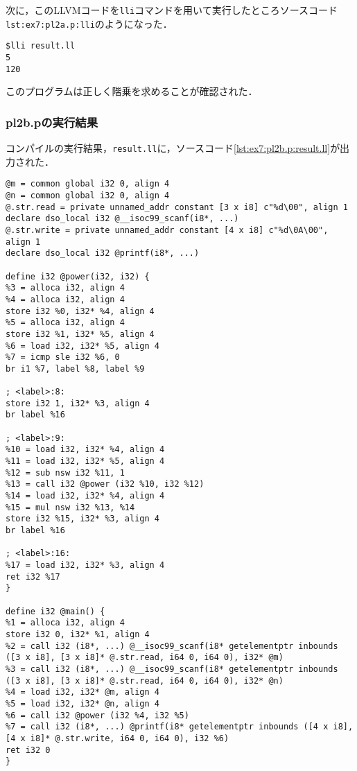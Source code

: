 \documentclass[uplatex]{jsarticle}
\begin{document}
次に，このLLVMコードを\verb#lli#コマンドを用いて実行したところソースコード\verb#lst:ex7:pl2a.p:lli#のようになった．

\begin{lstlisting}[caption=lliコマンド,label=lst:ex7:pl2a.p:lli]
$lli result.ll
5
120
\end{lstlisting}
このプログラムは正しく階乗を求めることが確認された．

\subsubsection{pl2b.pの実行結果}
コンパイルの実行結果，\verb#result.ll#に，ソースコード\ref{lst:ex7:pl2b.p:result.ll}が出力された．
\begin{lstlisting}[caption=result.ll,label=lst:ex7:pl2b.p:result.ll]
@m = common global i32 0, align 4
@n = common global i32 0, align 4
@.str.read = private unnamed_addr constant [3 x i8] c"%d\00", align 1
declare dso_local i32 @__isoc99_scanf(i8*, ...)
@.str.write = private unnamed_addr constant [4 x i8] c"%d\0A\00", align 1
declare dso_local i32 @printf(i8*, ...)

define i32 @power(i32, i32) {
%3 = alloca i32, align 4
%4 = alloca i32, align 4
store i32 %0, i32* %4, align 4
%5 = alloca i32, align 4
store i32 %1, i32* %5, align 4
%6 = load i32, i32* %5, align 4
%7 = icmp sle i32 %6, 0
br i1 %7, label %8, label %9

; <label>:8:
store i32 1, i32* %3, align 4
br label %16

; <label>:9:
%10 = load i32, i32* %4, align 4
%11 = load i32, i32* %5, align 4
%12 = sub nsw i32 %11, 1
%13 = call i32 @power (i32 %10, i32 %12)
%14 = load i32, i32* %4, align 4
%15 = mul nsw i32 %13, %14
store i32 %15, i32* %3, align 4
br label %16

; <label>:16:
%17 = load i32, i32* %3, align 4
ret i32 %17
}

define i32 @main() {
%1 = alloca i32, align 4
store i32 0, i32* %1, align 4
%2 = call i32 (i8*, ...) @__isoc99_scanf(i8* getelementptr inbounds ([3 x i8], [3 x i8]* @.str.read, i64 0, i64 0), i32* @m)
%3 = call i32 (i8*, ...) @__isoc99_scanf(i8* getelementptr inbounds ([3 x i8], [3 x i8]* @.str.read, i64 0, i64 0), i32* @n)
%4 = load i32, i32* @m, align 4
%5 = load i32, i32* @n, align 4
%6 = call i32 @power (i32 %4, i32 %5)
%7 = call i32 (i8*, ...) @printf(i8* getelementptr inbounds ([4 x i8], [4 x i8]* @.str.write, i64 0, i64 0), i32 %6)
ret i32 0
}
\end{lstlisting}
\end{document}
